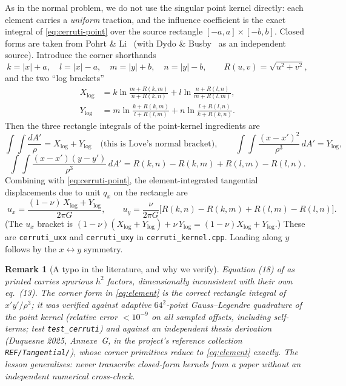 \documentclass[11pt,a4paper]{article}
\newtheorem{remark}[theorem]{Remark}
\newcommand{\abs}[1]{\lvert#1\rvert}
\newcommand{\code}[1]{\texttt{#1}}
\begin{document}
As in the normal problem, we do not use the singular point kernel directly:
each element carries a \emph{uniform} traction, and the influence
coefficient is the exact integral of \eqref{eq:cerruti-point} over the
source rectangle $[-a,a]\times[-b,b]$. Closed forms are taken from
Pohrt \& Li~\cite{PohrtLi2014} (with Dydo \& Busby~\cite{DydoBusby1995} as
an independent source). Introduce the corner shorthands
\begin{equation}
  k = \abs{x}+a,\quad l = \abs{x}-a,\quad m = \abs{y}+b,\quad n = \abs{y}-b,
  \qquad R(u,v) = \sqrt{u^2+v^2},
\end{equation}
and the two ``log brackets''
\begin{align}
  X_{\log} &= k \ln\!\frac{m + R(k,m)}{n + R(k,n)}
            + l \ln\!\frac{n + R(l,n)}{m + R(l,m)}, \\
  Y_{\log} &= m \ln\!\frac{k + R(k,m)}{l + R(l,m)}
            + n \ln\!\frac{l + R(l,n)}{k + R(k,n)}.
\end{align}
Then the three rectangle integrals of the point-kernel ingredients are
\begin{equation}
  \int\!\!\int \frac{dA'}{\rho} = X_{\log} + Y_{\log}
  \quad\text{(this is Love's normal bracket)},\qquad
  \int\!\!\int \frac{(x-x')^2}{\rho^3}\, dA' = Y_{\log},
\end{equation}
\begin{equation}
  \int\!\!\int \frac{(x-x')(y-y')}{\rho^3}\, dA'
  = R(k,n) - R(k,m) + R(l,m) - R(l,n).
\end{equation}
Combining with \eqref{eq:cerruti-point}, the element-integrated tangential
displacements due to unit $q_x$ on the rectangle are
\begin{equation}
  \boxed{\;
  u_x = \frac{(1-\nu)\,X_{\log} + Y_{\log}}{2\pi G},
  \qquad
  u_y = \frac{\nu}{2\pi G}
        \bigl[ R(k,n) - R(k,m) + R(l,m) - R(l,n) \bigr].
  \;}
  \label{eq:element}
\end{equation}
(The $u_x$ bracket is $(1-\nu)(X_{\log}+Y_{\log}) + \nu\,Y_{\log}
= (1-\nu)X_{\log} + Y_{\log}$.) These are \code{cerruti\_uxx} and
\code{cerruti\_uxy} in \code{cerruti\_kernel.cpp}. Loading along $y$ follows
by the $x \leftrightarrow y$ symmetry.

\begin{remark}[A typo in the literature, and why we verify]
Equation (18) of \cite{PohrtLi2014} as printed carries spurious $h^2$
factors, dimensionally inconsistent with their own eq.~(13). The corner form
in \eqref{eq:element} is the correct rectangle integral of
$x'y'/\rho^3$; it was verified against adaptive $64^2$-point Gauss--Legendre
quadrature of the point kernel (relative error $< 10^{-9}$ on all sampled
offsets, including self-terms; test \code{test\_cerruti}) and against an
independent thesis derivation (Duquesne 2025, Annexe~G, in the project's
reference collection \code{REF/Tangential/}), whose corner primitives reduce
to \eqref{eq:element} exactly. The lesson generalises: \emph{never} transcribe
closed-form kernels from a paper without an independent numerical
cross-check.
\end{remark}
\end{document}
